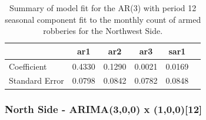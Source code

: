 \documentclass{article} %
\begin{document}
 
 \begin{table}[h]
	\label{tab:data}
	\begin{center}
	\begin{tabular}{lccccc}
			\hline
			&           ar1  &   ar2  & ar3 &   sar1    \\\hline
Coefficient   &   0.4330  &0.1290 & 0.0021&  0.0169  \\
Standard Error & 0.0798 & 0.0842 & 0.0782 & 0.0848   \\ 
		\end{tabular}
	\caption{Summary of model fit for the AR(3) with period 12 seasonal component fit to the monthly count of armed robberies for the Northwest Side.}
	\end{center}
\end{table}

 \break
 \newpage

 
\subsubsection{North Side - ARIMA(3,0,0) x (1,0,0)[12]}
 
\end{document}
